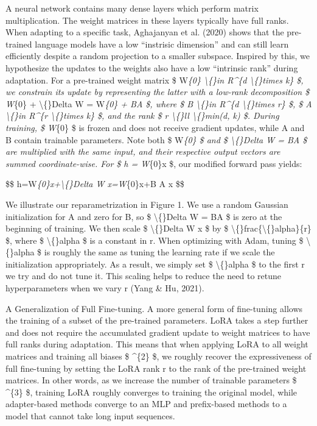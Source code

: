 \documentclass[conference]{IEEEtran}
\begin{document}
A neural network contains many dense layers which perform matrix multiplication. The weight matrices in these layers typically have full ranks. When adapting to a specific task, Aghajanyan et al. (2020) shows that the pre-trained language models have a low “instrisic dimension” and can still learn efficiently despite a random projection to a smaller subspace. Inspired by this, we hypothesize the updates to the weights also have a low “intrinsic rank” during adaptation. For a pre-trained weight matrix  \$ W\textit{\{0\} \textbackslash\{\}in R\textasciicircum{}\{d \textbackslash\{\}times k\} \$, we constrain its update by representing the latter with a low-rank decomposition  \$ W}\{0\} + \textbackslash\{\}Delta W = W\textit{\{0\} + BA \$, where  \$ B \textbackslash\{\}in R\textasciicircum{}\{d \textbackslash\{\}times r\} \$,  \$ A \textbackslash\{\}in R\textasciicircum{}\{r \textbackslash\{\}times k\} \$, and the rank  \$ r \textbackslash\{\}ll \textbackslash\{\}min(d, k) \$. During training,  \$ W}\{0\} \$ is frozen and does not receive gradient updates, while A and B contain trainable parameters. Note both  \$ W\textit{\{0\} \$ and  \$ \textbackslash\{\}Delta W = BA \$ are multiplied with the same input, and their respective output vectors are summed coordinate-wise. For  \$ h = W}\{0\}x \$, our modified forward pass yields:

\$\$ h=W\textit{\{0\}x+\textbackslash\{\}Delta W x=W}\{0\}x+B A x \$\$

We illustrate our reparametrization in Figure 1. We use a random Gaussian initialization for A and zero for B, so  \$ \textbackslash\{\}Delta W = BA \$ is zero at the beginning of training. We then scale  \$ \textbackslash\{\}Delta W x \$ by  \$ \textbackslash\{\}frac\{\textbackslash\{\}alpha\}\{r\} \$, where  \$ \textbackslash\{\}alpha \$ is a constant in r. When optimizing with Adam, tuning  \$ \textbackslash\{\}alpha \$ is roughly the same as tuning the learning rate if we scale the initialization appropriately. As a result, we simply set  \$ \textbackslash\{\}alpha \$ to the first r we try and do not tune it. This scaling helps to reduce the need to retune hyperparameters when we vary r (Yang \& Hu, 2021).

A Generalization of Full Fine-tuning. A more general form of fine-tuning allows the training of a subset of the pre-trained parameters. LoRA takes a step further and does not require the accumulated gradient update to weight matrices to have full ranks during adaptation. This means that when applying LoRA to all weight matrices and training all biases \$ \textasciicircum{}\{2\} \$, we roughly recover the expressiveness of full fine-tuning by setting the LoRA rank r to the rank of the pre-trained weight matrices. In other words, as we increase the number of trainable parameters \$ \textasciicircum{}\{3\} \$, training LoRA roughly converges to training the original model, while adapter-based methods converge to an MLP and prefix-based methods to a model that cannot take long input sequences.
\end{document}
